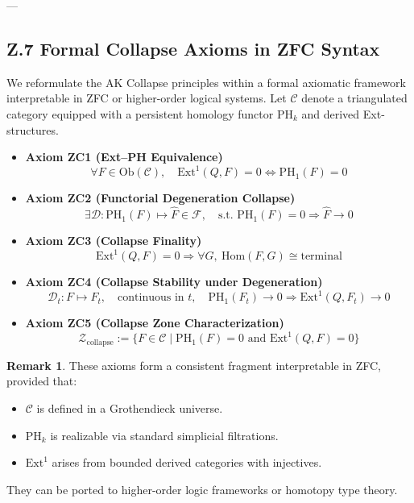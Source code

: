 \documentclass[11pt]{article}
\theoremstyle{definition}
\newtheorem{remark}[theorem]{Remark}
\begin{document}
---

\subsection*{Z.7 Formal Collapse Axioms in ZFC Syntax}

We reformulate the AK Collapse principles within a formal axiomatic framework interpretable in ZFC or higher-order logical systems. Let $\mathcal{C}$ denote a triangulated category equipped with a persistent homology functor $\mathrm{PH}_k$ and derived Ext-structures.

\begin{itemize}
  \item \textbf{Axiom ZC1 (Ext–PH Equivalence)}  
  \[
  \forall F \in \mathrm{Ob}(\mathcal{C}), \quad \mathrm{Ext}^1(Q, F) = 0 \iff \mathrm{PH}_1(F) = 0
  \]

  \item \textbf{Axiom ZC2 (Functorial Degeneration Collapse)}  
  \[
  \exists \mathcal{D}: \mathrm{PH}_1(F) \mapsto \widehat{F} \in \mathcal{F}, \quad
  \text{s.t. } \mathrm{PH}_1(F) = 0 \Rightarrow \widehat{F} \to 0
  \]

  \item \textbf{Axiom ZC3 (Collapse Finality)}  
  \[
  \mathrm{Ext}^1(Q, F) = 0 \Rightarrow \forall G, \ \mathrm{Hom}(F, G) \cong \text{terminal}
  \]

  \item \textbf{Axiom ZC4 (Collapse Stability under Degeneration)}  
  \[
  \mathcal{D}_t: F \mapsto F_t, \quad \text{continuous in } t, \quad \mathrm{PH}_1(F_t) \to 0 \Rightarrow \mathrm{Ext}^1(Q, F_t) \to 0
  \]

  \item \textbf{Axiom ZC5 (Collapse Zone Characterization)}  
  \[
  \mathcal{Z}_{\mathrm{collapse}} := \{F \in \mathcal{C} \mid \mathrm{PH}_1(F) = 0 \text{ and } \mathrm{Ext}^1(Q, F) = 0\}
  \]
\end{itemize}

\begin{remark}
These axioms form a consistent fragment interpretable in ZFC, provided that:
\begin{itemize}
  \item $\mathcal{C}$ is defined in a Grothendieck universe.
  \item $\mathrm{PH}_k$ is realizable via standard simplicial filtrations.
  \item $\mathrm{Ext}^1$ arises from bounded derived categories with injectives.
\end{itemize}
They can be ported to higher-order logic frameworks or homotopy type theory.
\end{remark}
\end{document}
